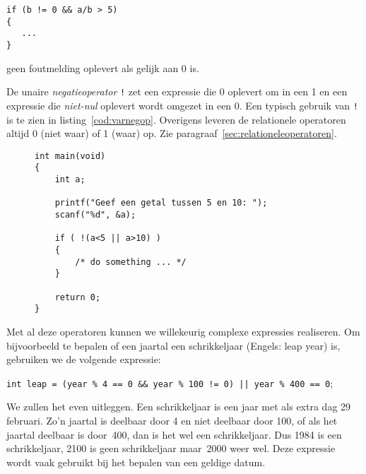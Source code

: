 \begin{lstlisting}[style=lstoneline]
if (b != 0 && a/b > 5)
{
   ...
}
\end{lstlisting}

geen foutmelding oplevert als  gelijk aan 0 is.

De unaire \textsl{negatieoperator} \texttt{!} zet een expressie die 0 oplevert om in een 1 en een expressie die \textsl{niet-nul} oplevert wordt omgezet in een 0. Een typisch gebruik van \texttt{!} is te zien in listing~\ref{cod:varnegop}. Overigens leveren de relationele operatoren altijd 0 (niet waar) of 1 (waar) op. Zie paragraaf~\ref{sec:relationeleoperatoren}.

\begin{figure}[!ht]
\begin{lstlisting}[caption=Voorbeeld van de negatieoperator.,label=cod:varnegop]
int main(void)
{
    int a;
    
    printf("Geef een getal tussen 5 en 10: ");
    scanf("%d", &a);
    
    if ( !(a<5 || a>10) )
    {
        /* do something ... */
    }

    return 0;
}
\end{lstlisting}
\end{figure}


Met al deze operatoren kunnen we willekeurig complexe expressies realiseren. Om bijvoorbeeld te bepalen of een jaartal een schrikkeljaar (Engels: leap year) is, gebruiken we de volgende expressie:

\hspace*{1em}\texttt{int leap = (year \% 4 == 0 \&\& year \% 100 != 0) || year \% 400 == 0};

We zullen het even uitleggen. Een schrikkeljaar is een jaar met als extra dag 29 februari. Zo'n jaartal is deelbaar door 4 en niet deelbaar door 100, of als het jaartal deelbaar is door~400, dan is het wel een schrikkeljaar. Dus 1984 is een schrikkeljaar, 2100 is geen schrikkeljaar maar~2000 weer wel. Deze expressie wordt vaak gebruikt bij het bepalen van een geldige datum.

